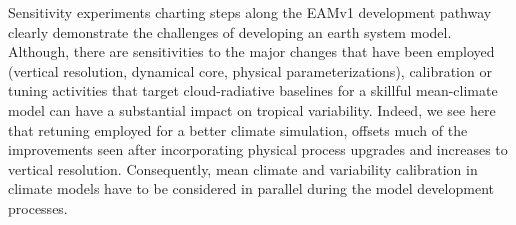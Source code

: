 \documentclass[draft,ms]{AGUTeX}
\begin{document}
\begin{article}
Sensitivity experiments charting steps along the EAMv1 development pathway clearly demonstrate the challenges of developing an earth system model. Although, there are sensitivities to the major changes that have been employed (vertical resolution, dynamical core, physical parameterizations), calibration or tuning activities that target cloud-radiative baselines for a skillful mean-climate model can have a substantial impact on tropical variability. Indeed, we see here that retuning employed for a better climate simulation, offsets much of the improvements seen after incorporating physical process upgrades and increases to vertical resolution. Consequently, mean climate and variability calibration in climate models have to be considered in parallel during the model development processes.




%
%
%
%
%
%
%





\end{article}
\end{document}
